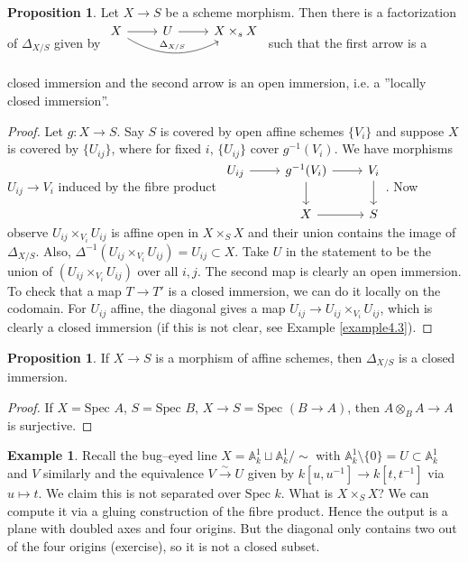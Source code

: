 \documentclass{article}
\theoremstyle{definition}
\newtheorem{prop}[theorem]{Proposition}
\newtheorem{example}{Example}[section]
\begin{document}
\begin{prop}\label{prop4.3}
    Let $X \to S$ be a scheme morphism. Then there is a factorization of $\Delta_{X/S}$ given by $\begin{tikzcd}[]
        X & U & X \times_s X\\
        \arrow["", from=1-1, to=1-2]
        \arrow["",from=1-2, to=1-3]
        \arrow["\Delta_{X/S}", from=1-1, to=1-3, bend right=30]
    \end{tikzcd}$ such that the first arrow is a closed immersion and the second arrow is an open immersion, i.e. a ''locally closed immersion''.
\end{prop}
\begin{proof}
    Let $g : X \to S$. Say $S$ is covered by open affine schemes $\{V_i\}$ and suppose $X$ is covered by $\{U_{ij}\}$, where for fixed $i$, $\{U_{ij}\}$ cover $g^{-1}(V_i)$. We have morphisms $U_{ij} \to V_i$ induced by the fibre product $\begin{tikzcd}[]
        U_{ij} & g^{-1}(V_i) & V_i\\
        & X & S
        \arrow["", from=1-1, to=1-2]
        \arrow["", from=1-2, to=1-3]
        \arrow["", from=1-2, to=2-2]
        \arrow["", from=2-2, to=2-3]
        \arrow["", from=1-3, to=2-3]
    \end{tikzcd}$. 
    Now observe $U_{ij} \times_{V_i} U_{ij}$ is affine open in $X \times_S X$ and their union contains the image of $\Delta_{X/S}$. Also, $\Delta^{-1}(U_{ij} \times_{V_i} U_{ij}) = U_{ij} \subset X$. Take $U$ in the statement to be the union of $(U_{ij} \times_{V_i} U_{ij})$ over all $i,j$. The second map is clearly an open immersion. To check that a map $T \to T'$ is a closed immersion, we can do it locally on the codomain. For $U_{ij}$ affine, the diagonal gives a map $U_{ij} \to U_{ij}\times_{V_i} U_{ij}$, which is clearly a closed immersion (if this is not clear, see Example \ref{example4.3}).
\end{proof}
\begin{prop}
    If $X \to S$ is a morphism of affine schemes, then $\Delta_{X/S}$ is a closed immersion.
\end{prop}
\begin{proof}
    If $X = \text{Spec }A$, $S = \text{Spec }B$, $X \to S = \text{Spec }(B \to A)$, then $A \otimes_B A \to A$ is surjective.
\end{proof}
\begin{example}
    Recall the bug--eyed line $X = \mathbb{A}_k^1 \sqcup \mathbb{A}_k^1 / \sim$ with $\mathbb{A}_k^1 \setminus \{0\} = U \subset \mathbb{A}_k^1$ and $V$ similarly and the equivalence $V \stackrel{\sim}{\to} U$ given by $k[u,u^{-1}] \to k[t,t^{-1}]$ via $u \mapsto t$. We claim this is not separated over $\text{Spec }k$. What is $X \times_S X$? We can compute it via a gluing construction of the fibre product. Hence the output is a plane with doubled axes and four origins. But the diagonal only contains two out of the four origins (exercise), so it is not a closed subset.
\end{example}
\end{document}
